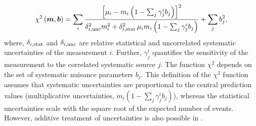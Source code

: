 \begin{description}
\begin{equation} 
    \chi^2\left(\boldsymbol{m},\boldsymbol{b}\right) =   
 \sum_i \frac{\left[ {\mu_i} - m_i \left( 1 - \sum_j \gamma^i_j b_j \right) \right]^2}
{ \textstyle \delta^2_{i,{\rm unc}}m_i^2 + \delta^2_{i,{\rm stat}}\, {\mu_i} m_i \left(1 - \sum_j \gamma^i_j b_j\right) }
  + \sum_j b^2_j,
\label{eq:aven}
\end{equation}
%
where, $\delta_{i,\rm stat}$ and $\delta_{i,\rm unc}$ are 
relative statistical and uncorrelated systematic uncertainties
of the measurement $i$.
Further, $\gamma^i_j$ quantifies the sensitivity of the
measurement to the correlated systematic source $j$. 
The function $\chi^2$ depends on
 the set of systematic nuisance parameters $b_j$.
This definition of the $\chi^2$ function assumes that
systematic uncertainties are proportional to the central prediction values
(multiplicative uncertainties, $m_i(1-\sum_j\gamma_j^ib_j)$), whereas the statistical uncertainties scale 
with the square root of the expected number of events. 
However, additive treatment of uncertainties is also possible in \fitter.



\end{description}
